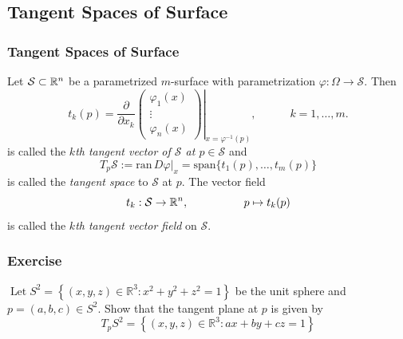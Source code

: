 \documentclass[12pt, t]{beamer}
\renewcommand{\emph}[1]{{\color{Turquoise3}\textsl{#1}}}
\begin{document}
\subsection{Tangent Spaces of Surface}
\begin{frame}
    \frametitle{Tangent Spaces of Surface}
    Let $\mathcal{S}\subset\mathbb{R}^n$ be a parametrized $m$-surface with parametrization $\varphi:\Omega\to\mathcal{S}$. Then
    \[t_k(p)=\frac{\partial}{\partial x_k}\left.\begin{pmatrix}
            \varphi_1(x) \\
            \vdots       \\
            \varphi_n(x)
        \end{pmatrix}\right|_{x=\varphi^{-1}(p)},\qquad\quad
        k=1,\ldots,m.\]
    is called the \emph{$k$th tangent vector of $\mathcal{S}$ at $p\in\mathcal{S}$} and
    \[T_p\mathcal{S}:=\text{ran}\,D\varphi|_x
        =\text{span}\{t_1(p),\ldots,t_m(p)\}\]
    is called the \emph{tangent space} to $\mathcal{S}$ at $p$. The vector field
    \[t_k:\mathcal{S}\to\mathbb{R}^n,\qquad\qquad\quad
        p\mapsto t_k(p)\]
    is called the \emph{$k$th tangent vector field} on $\mathcal{S}$.
\end{frame}

\begin{frame}
    \frametitle{Exercise}
    $\operatorname{Let} S^{2}=\left\{(x, y, z) \in \mathbb{R}^{3}: x^{2}+y^{2}+z^{2}=1\right\}$ be the unit sphere and $p=(a, b, c) \in S^{2} .$ Show that the tangent plane at $p$ is given by
    \[
        T_{p} S^{2}=\left\{(x, y, z) \in \mathbb{R}^{3}: a x+b y+c z=1\right\}
    \]
\end{frame}
\end{document}
